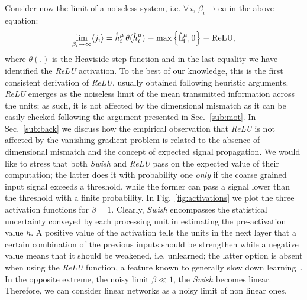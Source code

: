 \documentclass[5p]{elsarticle}
\begin{document}
Consider now the limit of a noiseless system, i.e. $\forall \, i$, $\beta_i \to \infty $ in the above equation:
%
\begin{equation} \label{eq:ps6}
\lim_{\beta_i \to \infty } \langle j_i \rangle =  \hat{h}^{\mu}_i \, \theta(\hat{h}^{\mu}_i)  \equiv   \rm{max} \left\{ \hat{h}^{\mu}_i, 0\right\} \equiv ReLU,
\end{equation}
%
where $\theta(.)$ is the Heaviside step function and in the last equality we have identified the {\it ReLU} activation. To the best of our knowledge, this is the first consistent derivation of {\it ReLU}, usually obtained following heuristic arguments. {\it ReLU} emerges as the noiseless limit of the mean transmitted information across the units; as such, it is not affected by the dimensional mismatch as it can be easily checked following the argument presented in Sec.~\eqref{sub:mot}. In Sec.~\eqref{sub:back} we discuss how the empirical observation that  {\it ReLU}  is not affected by the vanishing gradient problem is related to the absence of dimensional mismatch and the concept of expected signal propagation. We would like to stress that both {\it Swish} and {\it ReLU} pass on the expected value of their computation; the latter does it with probability one {\it only} if the coarse grained input signal exceeds a threshold, while the former can pass a signal lower than the threshold with a finite probability. In Fig.~\eqref{fig:activations} we plot the three activation functions for $\beta=1$. Clearly, {\it Swish} encompasses the statistical uncertainty conveyed by each processing unit in estimating the pre-activation value $h$. A positive value of the activation tells the units in the next layer that a certain combination of the previous inputs should be strengthen while a negative value means that it should be weakened, i.e. unlearned; the latter option is absent when using the {\it ReLU} function, a feature known to generally slow down learning~\cite{engel}. In the opposite extreme, the noisy limit $\beta \ll 1$, the {\it Swish} becomes linear. Therefore, we can consider linear networks as a noisy limit of non linear ones.
%
\end{document}
